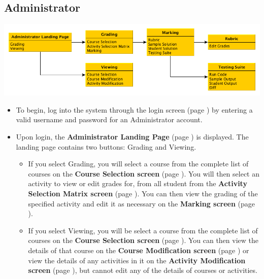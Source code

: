 \documentclass{article}
\begin{document}
\subsection{Administrator}
\centerline{\includegraphics[scale=0.6]{../images/UIMockups/pngs/admin}}
\begin{itemize}
  \item To begin, log into the system through the login screen (page \pageref{login})
    by entering a valid username and password for an Administrator account.
  \item Upon login, the \textbf{Administrator Landing Page} (page \pageref{landPg})
    is displayed. The landing page contains two buttons: Grading and Viewing.
    \begin{itemize}
    \item If you select Grading, you will select a course from the complete list of 
      courses on the \textbf{Course Selection screen} (page \pageref{courseSel}). 
      You will then select an 
      activity to view or edit grades for, from all student from the \textbf{Activity 
    	 Selection Matrix screen} (page \pageref{actSel}). You can then view the 
	 grading of the specified
      activity and edit it as necessary on the \textbf{Marking screen} (page
      \pageref{marking}).
    \item If you select Viewing, you will be select a course from the complete list of 
      courses on the \textbf{Course Selection screen} (page \pageref{courseSel}). You can then view the
      details of that course on the \textbf{Course Modification screen} (page \pageref{createCourse})
      or view the details of any activities in it on the \textbf{Activity Modification screen}
      (page \pageref{newActivity}), but
      cannot edit any of the details of courses or activities.
    \end{itemize}
\end{itemize}
\end{document}

